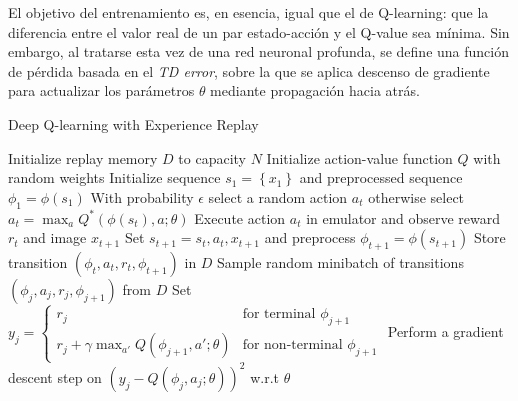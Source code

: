 El objetivo del entrenamiento es, en esencia, igual que el de Q-learning: que la diferencia entre el valor real de un par estado-acción y el Q-value sea mínima. Sin embargo, al tratarse esta vez de una red neuronal profunda, se define una función de pérdida basada en el \emph{TD error}, sobre la que se aplica descenso de gradiente para actualizar los parámetros $\theta$ mediante propagación hacia atrás.

\begin{algorithm}[H]
\caption{Deep Q-learning with Experience Replay}
\label{alg:deep-q-learning}
\begin{algorithmic}
\State Initialize replay memory $D$ to capacity $N$
\State Initialize action-value function $Q$ with random weights
    \State Initialize sequence $s_1 = \left\{ x_1 \right\}$ and preprocessed sequence $\phi_1 = \phi(s_1)$
        \State With probability $\epsilon$ select a random action $a_t$
        \State otherwise select $a_t = \max_a Q^*(\phi(s_t), a; \theta)$
        \State Execute action $a_t$ in emulator and observe reward $r_t$ and image $x_{t+1}$
        \State Set $s_{t+1} = s_t, a_t, x_{t+1}$ and preprocess $\phi_{t+1} = \phi(s_{t+1})$
        \State Store transition $(\phi_t, a_t, r_t, \phi_{t+1})$ in $D$
        \State Sample random minibatch of transitions $(\phi_j, a_j, r_j,\phi_{j+1})$ from $D$
        \State Set $y_j =
        \begin{cases}
        r_j & \text{for terminal } \phi_{j+1} \\
        r_j + \gamma \max_{a'}Q(\phi_{j+1},a';\theta) & \text{for non-terminal } \phi_{j+1}
        \end{cases}
        $
        \State Perform a gradient descent step on $(y_j - Q(\phi_j , a_j ; \theta))^2$ w.r.t $\theta$
    \EndFor
\EndFor
\end{algorithmic}
\end{algorithm}


\newpage

